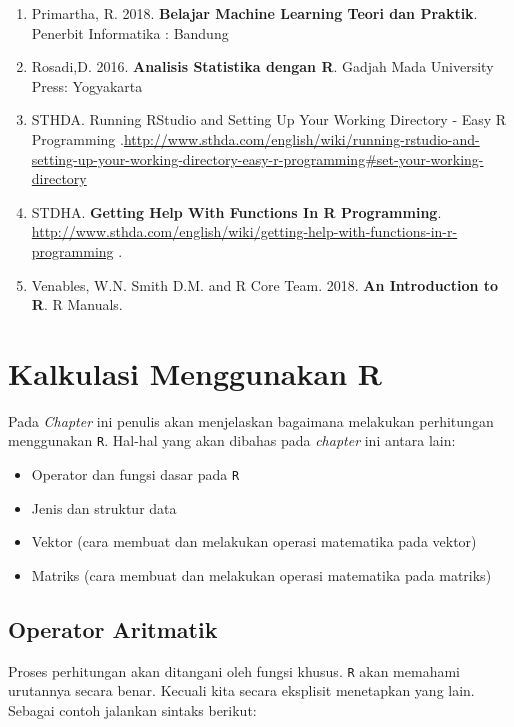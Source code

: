 \documentclass[]{book}
\providecommand{\tightlist}{%
  \setlength{\itemsep}{0pt}\setlength{\parskip}{0pt}}
\theoremstyle{definition}
\theoremstyle{definition}
\theoremstyle{definition}
\theoremstyle{remark}
\begin{document}
\begin{enumerate}
\def\labelenumi{\arabic{enumi}.}
\tightlist
\item
  Primartha, R. 2018. \textbf{Belajar Machine Learning Teori dan Praktik}. Penerbit Informatika : Bandung
\item
  Rosadi,D. 2016. \textbf{Analisis Statistika dengan R}. Gadjah Mada University Press: Yogyakarta
\item
  STHDA. Running RStudio and Setting Up Your Working Directory - Easy R Programming .\url{http://www.sthda.com/english/wiki/running-rstudio-and-setting-up-your-working-directory-easy-r-programming\#set-your-working-directory}
\item
  STDHA. \textbf{Getting Help With Functions In R Programming}. \url{http://www.sthda.com/english/wiki/getting-help-with-functions-in-r-programming} .
\item
  Venables, W.N. Smith D.M. and R Core Team. 2018. \textbf{An Introduction to R}. R Manuals.
\end{enumerate}

\hypertarget{calculation}{%
\chapter{Kalkulasi Menggunakan R}\label{calculation}}

Pada \emph{Chapter} ini penulis akan menjelaskan bagaimana melakukan perhitungan menggunakan \texttt{R}. Hal-hal yang akan dibahas pada \emph{chapter} ini antara lain:

\begin{itemize}
\tightlist
\item
  Operator dan fungsi dasar pada \texttt{R}
\item
  Jenis dan struktur data
\item
  Vektor (cara membuat dan melakukan operasi matematika pada vektor)
\item
  Matriks (cara membuat dan melakukan operasi matematika pada matriks)
\end{itemize}

\hypertarget{aritmetikoperator}{%
\section{Operator Aritmatik}\label{aritmetikoperator}}

Proses perhitungan akan ditangani oleh fungsi khusus. \texttt{R} akan memahami urutannya secara benar. Kecuali kita secara eksplisit menetapkan yang lain. Sebagai contoh jalankan sintaks berikut:
\end{document}
